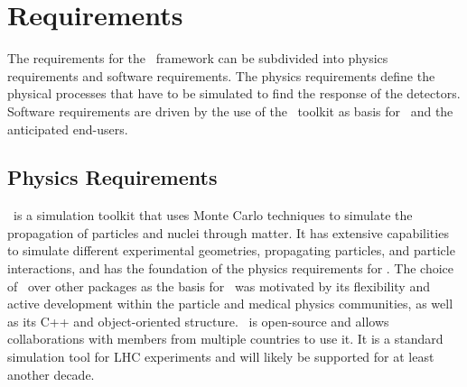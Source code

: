 \documentclass[article]{IEEEtran}
\begin{document}
\section{Requirements}
\label{section:Requirements}

The requirements for the \MaGe\ framework can be subdivided into physics requirements and software requirements. 
The physics requirements define the physical processes that have to be simulated to find the response of the detectors. 
Software requirements are driven by the use of the \GF\ toolkit as basis for \MaGe\ and the anticipated end-users. 

\subsection{Physics Requirements} 
\label{se:physics_requirements}

\GF\ is a simulation toolkit that uses Monte Carlo techniques to simulate the propagation of particles and nuclei through matter. It has extensive capabilities to simulate different experimental geometries, propagating particles, and particle interactions, and has the foundation of the physics requirements for \MaGe. 
The choice of \GF\ over other packages as the basis for \MaGe\ was motivated
by its flexibility and active development within the particle and
medical physics communities, as well as its C++ and object-oriented structure. \GF\ is open-source and allows collaborations with members from multiple countries to use it. It is a standard simulation tool for LHC experiments and will likely be supported for at least another decade. 
\end{document}
